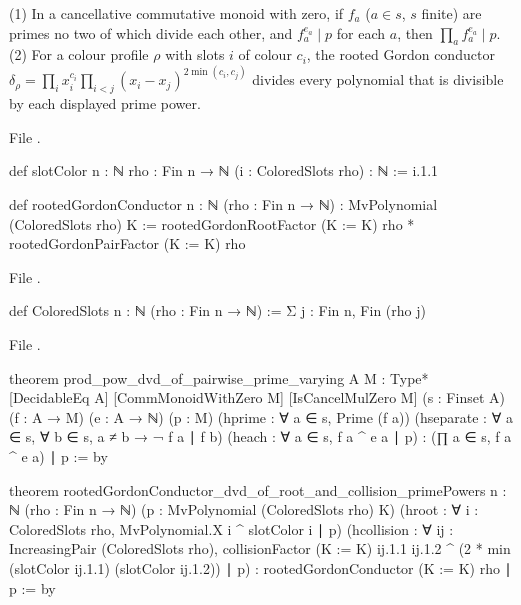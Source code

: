\begin{theorem}\label{l20:thm:rooted}
(1) In a cancellative commutative monoid with zero, if $f_a$ ($a\in s$, $s$ finite) are primes no two of which divide each other, and
$f_a^{e_a}\mid p$ for each $a$, then $\prod_af_a^{e_a}\mid p$. (2) For a colour profile $\rho$ with slots $i$ of colour $c_i$, the rooted
Gordon conductor $\delta_\rho=\prod_ix_i^{c_i}\prod_{i<j}(x_i-x_j)^{2\min(c_i,c_j)}$ divides every polynomial that is divisible by each
displayed prime power.
\end{theorem}
\noindent File .
\begin{leancode}
def slotColor {n : ℕ} {rho : Fin n → ℕ} (i : ColoredSlots rho) : ℕ :=
  i.1.1

def rootedGordonConductor {n : ℕ} (rho : Fin n → ℕ) :
    MvPolynomial (ColoredSlots rho) K :=
  rootedGordonRootFactor (K := K) rho * rootedGordonPairFactor (K := K) rho
\end{leancode}
\noindent File .
\begin{leancode}
def ColoredSlots {n : ℕ} (rho : Fin n → ℕ) :=
  Σ j : Fin n, Fin (rho j)
\end{leancode}
\noindent File .
\begin{leancode}
theorem prod_pow_dvd_of_pairwise_prime_varying
    {A M : Type*} [DecidableEq A] [CommMonoidWithZero M] [IsCancelMulZero M]
    (s : Finset A) (f : A → M) (e : A → ℕ) (p : M)
    (hprime : ∀ a ∈ s, Prime (f a))
    (hseparate : ∀ a ∈ s, ∀ b ∈ s, a ≠ b → ¬ f a ∣ f b)
    (heach : ∀ a ∈ s, f a ^ e a ∣ p) :
    (∏ a ∈ s, f a ^ e a) ∣ p := by

theorem rootedGordonConductor_dvd_of_root_and_collision_primePowers {n : ℕ} (rho : Fin n → ℕ)
    (p : MvPolynomial (ColoredSlots rho) K)
    (hroot : ∀ i : ColoredSlots rho, MvPolynomial.X i ^ slotColor i ∣ p)
    (hcollision : ∀ ij : IncreasingPair (ColoredSlots rho),
      collisionFactor (K := K) ij.1.1 ij.1.2 ^
        (2 * min (slotColor ij.1.1) (slotColor ij.1.2)) ∣ p) :
    rootedGordonConductor (K := K) rho ∣ p := by
\end{leancode}

